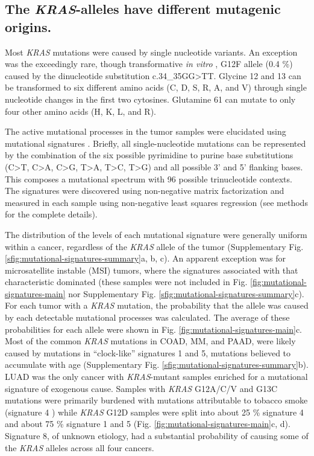 \documentclass[english, 12pt, letterpaper]{article}
\newcommand{\KRAS}{\emph{KRAS}}
\begin{document}
\subsection*{The \KRAS{}-alleles have different mutagenic origins.}

Most \KRAS{} mutations were caused by single nucleotide variants.
An exception was the exceedingly rare, though transformative \emph{in vitro} \cite{Barbacid1987}, G12F allele (0.4 \%) caused by the dinucleotide substitution c.34\_35GG>TT. Glycine 12 and 13 can be transformed to six different amino acids (C, D, S, R, A, and V) through single nucleotide changes in the first two cytosines.
Glutamine 61 can mutate to only four other amino acids (H, K, L, and R).

The active mutational processes in the tumor samples were elucidated using mutational signatures \cite{Alexandrov2013}. 
Briefly, all single-nucleotide mutations can be represented by the combination of the six possible pyrimidine to purine base substitutions (C>T, C>A, C>G, T>A, T>C, T>G) and all possible 3’ and 5’ flanking bases. 
This composes a mutational spectrum with 96 possible trinucleotide contexts. 
The signatures were discovered using non-negative matrix factorization and measured in each sample using non-negative least squares regression (see methods for the complete details). 

The distribution of the levels of each mutational signature were generally uniform within a cancer, regardless of the \KRAS{} allele of the tumor (Supplementary Fig. \ref{sfig:mutational-signatures-summary}a, b, c). 
An apparent exception was for microsatellite instable (MSI) tumors, where the signatures associated with that characteristic dominated (these samples were not included in Fig. \ref{fig:mutational-signatures-main} nor Supplementary Fig. \ref{sfig:mutational-signatures-summary}c). 
For each tumor with a \KRAS{} mutation, the probability that the allele was caused by each detectable mutational processes was calculated. 
The average of these probabilities for each allele were shown in Fig. \ref{fig:mutational-signatures-main}c. 
Most of the common \KRAS{} mutations in COAD, MM, and PAAD, were likely caused by mutations in “clock-like” signatures 1 and 5, mutations believed to accumulate with age \cite{Alexandrov2015} (Supplementary Fig. \ref{sfig:mutational-signatures-summary}b). 
LUAD was the only cancer with \KRAS{}-mutant samples enriched for a mutational signature of exogenous cause. 
Samples with \KRAS{} G12A/C/V and G13C mutations were primarily burdened with mutations attributable to tobacco smoke (signature 4 \cite{Alexandrov2016}) while \KRAS{} G12D samples were split into about 25 \% signature 4 and about 75 \% signature 1 and 5 (Fig. \ref{fig:mutational-signatures-main}c, d).
Signature 8, of unknown etiology, had a substantial probability of causing some of the \KRAS{} alleles across all four cancers.
\end{document}
